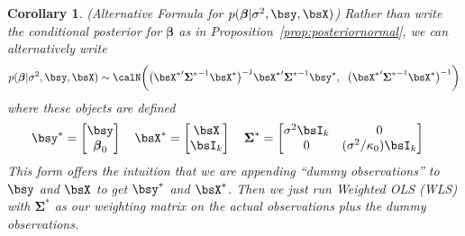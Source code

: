 \documentclass[12pt]{article}
\theoremstyle{plain}
\newtheorem{cor}[thm]{Corollary}
\theoremstyle{definition}
\theoremstyle{remark}
\newcommand{\bsSigma}{\boldsymbol{\Sigma}}
\newcommand{\bsbeta}{\boldsymbol{\beta}}
\begin{document}
\begin{cor}
\emph{(Alternative Formula for $p(\bsbeta|\sigma^2,\bsy,\bsX)$)}
Rather than write the conditional posterior for $\bsbeta$ as in
Proposition~\ref{prop:posteriornormal}, we can alternatively write
\begin{align*}
  p(\bsbeta | \sigma^2, \bsy, \bsX)
  \sim
  \calN\bigg(
  \big(
  {\bsX^*}'
  {\bsSigma^*}^{-1}
  \bsX^*
  \big)^{-1}
  {\bsX^*}'{\bsSigma^*}^{-1} \bsy^*,\;\;
  \big(
  {\bsX^*}'
  {\bsSigma^*}^{-1}
  \bsX^*
  \big)^{-1}
  \bigg)
\end{align*}
where these objects are defined
\begin{align*}
  \bsy^*=
  \begin{bmatrix}
    \bsy \\ \bsbeta_0
  \end{bmatrix}
  \quad
  \bsX^*=
  \begin{bmatrix}
    \bsX \\ \bsI_k
  \end{bmatrix}
  \quad
  \bsSigma^*=
  \begin{bmatrix}
    \sigma^2\bsI_k & 0 \\
    0 &  (\sigma^2/\kappa_0)\bsI_k
  \end{bmatrix}
  \quad
\end{align*}
This form offers the intuition that we are appending ``dummy
observations'' to $\bsy$ and $\bsX$ to get $\bsy^*$ and $\bsX^*$. Then
we just run Weighted OLS (WLS) with $\bsSigma^*$ as our weighting matrix
on the actual observations plus the dummy observations.
\end{cor}
\end{document}
